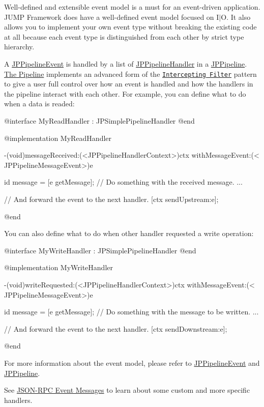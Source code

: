 Well-\/defined and extensible event model is a must for an event-\/driven application. JUMP Framework does have a well-\/defined event model focused on I$|$O. It also allows you to implement your own event type without breaking the existing code at all because each event type is distinguished from each other by strict type hierarchy. 

A \hyperlink{a00023}{JPPipelineEvent} is handled by a list of \hyperlink{a00029}{JPPipelineHandler} in a \hyperlink{a00019}{JPPipeline}. \hyperlink{a00001}{The Pipeline} implements an advanced form of the \href{http://java.sun.com/blueprints/corej2eepatterns/Patterns/InterceptingFilter.html}{\tt Intercepting Filter} pattern to give a user full control over how an event is handled and how the handlers in the pipeline interact with each other. For example, you can define what to do when a data is readed: 
\begin{DoxyCode}
 @interface MyReadHandler : JPSimplePipelineHandler {}
 @end
 
 @implementation MyReadHandler
 
 -(void)messageReceived:(<JPPipelineHandlerContext>)ctx withMessageEvent:(<
      JPPipelineMessageEvent>)e {
          id message = [e getMessage];
          // Do something with the received message.
          ...
          
          // And forward the event to the next handler.
          [ctx sendUpstream:e];
 }
 @end
\end{DoxyCode}
 You can also define what to do when other handler requested a write operation: 
\begin{DoxyCode}
 @interface MyWriteHandler : JPSimplePipelineHandler {}
 @end
 
 @implementation MyWriteHandler
 
 -(void)writeRequested:(<JPPipelineHandlerContext>)ctx withMessageEvent:(<
      JPPipelineMessageEvent>)e {
          id message = [e getMessage];
          // Do something with the message to be written.
          ...
          
          // And forward the event to the next handler.
          [ctx sendDownstream:e];
 }
 @end
\end{DoxyCode}


For more information about the event model, please refer to \hyperlink{a00023}{JPPipelineEvent} and \hyperlink{a00019}{JPPipeline}. 

See \hyperlink{a00008}{JSON-\/RPC Event Messages} to learn about some custom and more specific handlers. \par
 \par
 